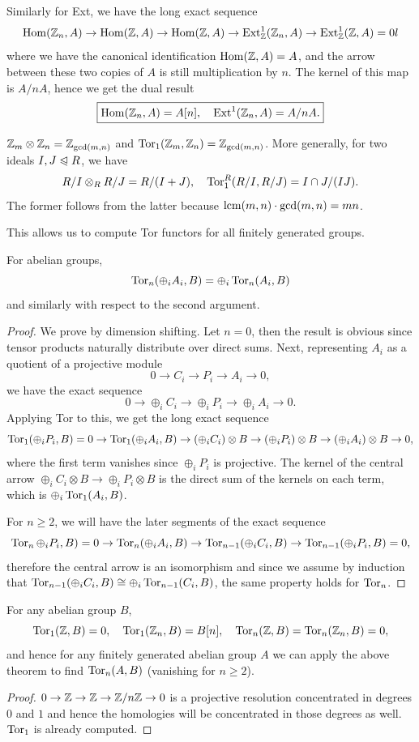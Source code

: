 Similarly for Ext, we have the long exact sequence
\[\operatorname{Hom}(\mathbb{Z}_n,A)\to \operatorname{Hom}(\mathbb{Z},A)\to \operatorname{Hom}(\mathbb{Z},A)\to \operatorname{Ext}^1_{\mathbb{Z}}(\mathbb{Z}_n,A)\to \operatorname{Ext}^1_{\mathbb{Z}}(\mathbb{Z},A)=0l\]
where we have the canonical identification $\operatorname{Hom}(\mathbb{Z},A)=A$, and the arrow between these two copies of $A$ is still multiplication by $n$. The kernel of this map is $A\slash nA$, hence we get the dual result
\[\boxed{\operatorname{Hom}(\mathbb{Z}_n,A)=A[n],\quad \operatorname{Ext}^1(\mathbb{Z}_n,A)=A\slash nA.}\]
    
\begin{cor}
    $\mathbb{Z}_m\otimes \mathbb{Z}_n=\mathbb{Z}_{\gcd(m,n)}$ and $\operatorname{Tor}_1(\mathbb{Z}_m,\mathbb{Z}_n)=\mathbb{Z}_{\gcd(m,n)}$. More generally, for two ideals $I,J\trianglelefteqslant R$, we have
    \[R\slash I\otimes_R R\slash J=R\slash(I+J),\quad \operatorname{Tor}_1^R(R\slash I,R\slash J)=I\cap J\slash (IJ).\]
    The former follows from the latter because $\operatorname{lcm}(m,n)\cdot\gcd(m,n)=mn$.
\end{cor}

This allows us to compute Tor functors for all finitely generated groups.

\begin{thm}
    For abelian groups,
    \[\operatorname{Tor}_n(\oplus_i A_i,B)=\oplus_i \operatorname{Tor}_n(A_i,B)\]
    and similarly with respect to the second argument.
\end{thm}
\begin{proof}
    We prove by dimension shifting. Let $n=0$, then the result is obvious since tensor products naturally distribute over direct sums.
     Next, representing $A_i$ as a quotient of a projective module
     \[0\to C_i\to P_i\to A_i\to 0,\]
     we have the exact sequence
     \[0\to \oplus_i C_i\to \oplus_i P_i\to \oplus_i A_i\to 0.\]
     Applying Tor to this, we get the long exact sequence
     \[\operatorname{Tor}_1(\oplus_i P_i,B)=0\to\operatorname{Tor}_1(\oplus_i A_i,B)\to (\oplus_i C_i)\otimes B\to (\oplus_i P_i)\otimes B\to (\oplus_i A_i)\otimes B\to 0,\]
     where the first term vanishes since $\oplus_i P_i$ is projective. The kernel of the central arrow $\oplus_i C_i\otimes B\to \oplus_i P_i\otimes B$ is the direct sum of the kernels on each term, which is $\oplus_i\operatorname{Tor}_1(A_i,B)$.

     For $n\geq 2$, we will have the later segments of the exact sequence
     \[\operatorname{Tor}_n\oplus_i P_i,B)=0\to \operatorname{Tor}_n(\oplus_iA_i,B)\to \operatorname{Tor}_{n-1}(\oplus_iC_i,B)\to \operatorname{Tor}_{n-1}(\oplus_i P_i,B)=0,\]
     therefore the central arrow is an isomorphism and since we assume by induction that $\operatorname{Tor}_{n-1}(\oplus_iC_i,B)\cong\oplus_i\operatorname{Tor}_{n-1}(C_i,B)$, the same property holds for $\operatorname{Tor}_n$.
\end{proof}
\begin{cor}
    For any abelian group $B$,
    \[\operatorname{Tor}_1(\mathbb{Z},B)=0,\quad \operatorname{Tor}_1(\mathbb{Z}_n,B)=B[n],\quad \operatorname{Tor}_n(\mathbb{Z},B)=\operatorname{Tor}_n(\mathbb{Z}_n,B)=0,\]
    and hence for any finitely generated abelian group $A$ we can apply the above theorem to find $\operatorname{Tor}_n(A,B)$ (vanishing for $n\geq 2$).
\end{cor}
\begin{proof}
    $0\to \mathbb{Z}\to \mathbb{Z}\to \mathbb{Z}\slash n\mathbb{Z} \to 0$ is a projective resolution concentrated in degrees $0$ and $1$ and hence the homologies will be concentrated in those degrees as well. $\operatorname{Tor}_1$ is already computed.
\end{proof}

